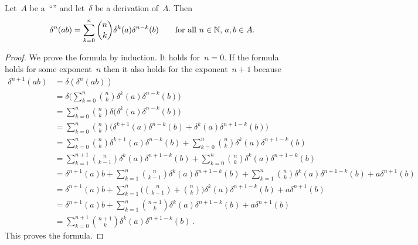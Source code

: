 \begin{lemma}
  Let~$A$ be a~\enquote{\algebra{$\kf$}} and let~$\delta$ be a derivation of~$A$.
  Then
  \[
    \delta^n(ab)
    =
    \sum_{k=0}^n
    \binom{n}{k}
    \delta^k(a) \delta^{n-k}(b)
    \qquad
    \text{for all~$n \in \mathbb{N}$,~$a, b \in A$.}
  \]
\end{lemma}


\begin{proof}
  We prove the formula by induction.
  It holds for~$n = 0$.
  If the formula holds for some exponent~$n$ then it also holds for the exponent~$n + 1$ because
  \begingroup
  \allowdisplaybreaks
  \begin{align*}
    \delta^{n+1}(ab)
    &=
    \delta( \delta^n(ab) )
    \\
    &=
    \delta
    \Biggl(
      \sum_{k=0}^n
      \binom{n}{k}
      \delta^k(a) \delta^{n-k}(b)
    \Biggr)
    \\
    &=
    \sum_{k=0}^n
    \binom{n}{k}
    \delta
    \bigl(
      \delta^k(a) \delta^{n-k}(b)
    \bigr)
    \\
    &=
    \sum_{k=0}^n
    \binom{n}{k}
    \bigl(
      \delta^{k+1}(a) \delta^{n-k}(b)
      +
      \delta^k(a) \delta^{n+1-k}(b)
    \bigr)
    \\
    &=
    \sum_{k=0}^n
    \binom{n}{k}
    \delta^{k+1}(a) \delta^{n-k}(b)
    +
    \sum_{k=0}^n
    \binom{n}{k}
    \delta^k(a) \delta^{n+1-k}(b)
    \\
    &=
    \sum_{k=1}^{n+1}
    \binom{n}{k-1}
    \delta^{k}(a) \delta^{n+1-k}(b)
    +
    \sum_{k=0}^n
    \binom{n}{k}
    \delta^k(a) \delta^{n+1-k}(b)
    \\
    &=
    \delta^{n+1}(a) b
    +
    \sum_{k=1}^n
    \binom{n}{k-1}
    \delta^{k}(a) \delta^{n+1-k}(b)
    +
    \sum_{k=1}^n
    \binom{n}{k}
    \delta^k(a) \delta^{n+1-k}(b)
    +
    a \delta^{n+1}(b)
    \\
    &=
    \delta^{n+1}(a) b
    +
    \sum_{k=1}^n
    \Biggl(
      \binom{n}{k-1}
      +
      \binom{n}{k}
    \Biggr)
    \delta^k(a) \delta^{n+1-k}(b)
    +
    a \delta^{n+1}(b)
    \\
    &=
    \delta^{n+1}(a) b
    +
    \sum_{k=1}^n
    \binom{n+1}{k}
    \delta^k(a) \delta^{n+1-k}(b)
    +
    a \delta^{n+1}(b)
    \\
    &=
    \sum_{k=0}^{n+1}
    \binom{n+1}{k}
    \delta^k(a) \delta^{n+1-k}(b) \,.
  \end{align*}
  \endgroup
  This proves the formula.
\end{proof}


